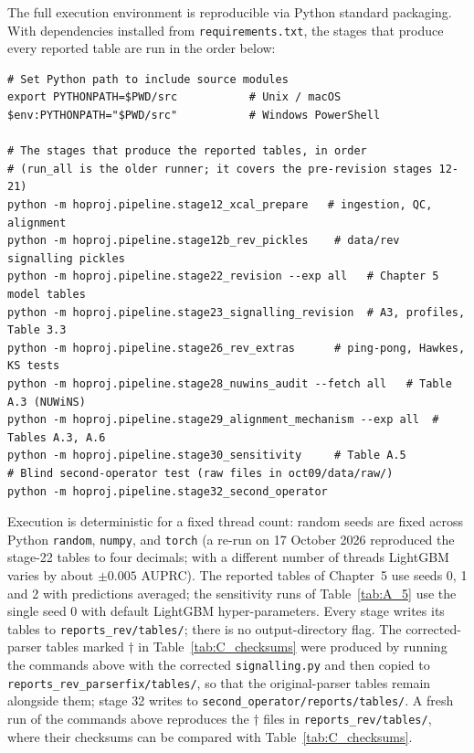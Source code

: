 The full execution environment is reproducible via Python standard packaging. With dependencies installed from \texttt{requirements.txt}, the stages that produce every reported table are run in the order below:

\begin{verbatim}
# Set Python path to include source modules
export PYTHONPATH=$PWD/src           # Unix / macOS
$env:PYTHONPATH="$PWD/src"           # Windows PowerShell

# The stages that produce the reported tables, in order
# (run_all is the older runner; it covers the pre-revision stages 12-21)
python -m hoproj.pipeline.stage12_xcal_prepare   # ingestion, QC, alignment
python -m hoproj.pipeline.stage12b_rev_pickles    # data/rev signalling pickles
python -m hoproj.pipeline.stage22_revision --exp all   # Chapter 5 model tables
python -m hoproj.pipeline.stage23_signalling_revision  # A3, profiles, Table 3.3
python -m hoproj.pipeline.stage26_rev_extras      # ping-pong, Hawkes, KS tests
python -m hoproj.pipeline.stage28_nuwins_audit --fetch all   # Table A.3 (NUWiNS)
python -m hoproj.pipeline.stage29_alignment_mechanism --exp all  # Tables A.3, A.6
python -m hoproj.pipeline.stage30_sensitivity     # Table A.5
# Blind second-operator test (raw files in oct09/data/raw/)
python -m hoproj.pipeline.stage32_second_operator
\end{verbatim}

Execution is deterministic for a fixed thread count: random seeds are fixed across Python \texttt{random}, \texttt{numpy}, and \texttt{torch} (a re-run on 17 October 2026 reproduced the stage-22 tables to four decimals; with a different number of threads LightGBM varies by about $\pm 0.005$ AUPRC). The reported tables of Chapter~5 use seeds 0, 1 and 2 with predictions averaged; the sensitivity runs of Table~\ref{tab:A_5} use the single seed 0 with default LightGBM hyper-parameters. Every stage writes its tables to \texttt{reports\_rev/tables/}; there is no output-directory flag. The corrected-parser tables marked $\dagger$ in Table~\ref{tab:C_checksums} were produced by running the commands above with the corrected \texttt{signalling.py} and then copied to \texttt{reports\_rev\_parserfix/tables/}, so that the original-parser tables remain alongside them; stage 32 writes to \texttt{second\_operator/reports/tables/}. A fresh run of the commands above reproduces the $\dagger$ files in \texttt{reports\_rev/tables/}, where their checksums can be compared with Table~\ref{tab:C_checksums}.
